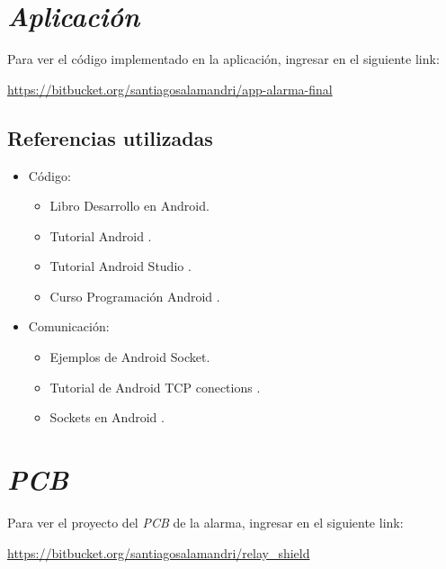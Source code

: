 \section{{\emph{Aplicación}}}

Para ver el código implementado en la aplicación, ingresar en el siguiente link:

\href{url}{https://bitbucket.org/santiagosalamandri/app-alarma-final}

\subsection{Referencias utilizadas}
\begin{itemize}
\item Código:
\begin{itemize}
\item Libro Desarrollo en Android\cite{android1Book}.
\item Tutorial Android \cite{android1}.
\item Tutorial Android Studio \cite{android2}.
\item Curso Programación Android \cite{android3}.
\end{itemize}

\item Comunicación:
\begin{itemize}
\item Ejemplos de Android Socket\cite{socket6}.
\item Tutorial de Android TCP conections \cite{socket7}.
\item Sockets en Android \cite{socket8}. 
\end{itemize}

\end{itemize}

\section{{\emph{PCB}}}
Para ver el proyecto del \textit{PCB} de la alarma, ingresar en el siguiente link:

\href{url}{https://bitbucket.org/santiagosalamandri/relay\_shield}
